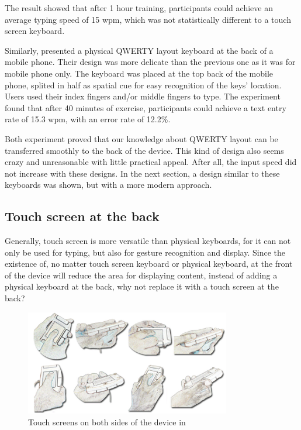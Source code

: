 \documentclass[11pt]{article}
\begin{document}
The result showed that after 1 hour training, participants could achieve an average typing speed of 15 wpm, which was not statistically different to a touch screen keyboard. 

Similarly, \citet{backkey2012} presented a physical QWERTY layout keyboard at the back of a mobile phone. Their design was more delicate than the previous one as it was for mobile phone only. The keyboard was placed at the top back of the mobile phone, splited in half as spatial cue for easy recognition of the keys' location. Users used their index fingers and/or middle fingers to type. The experiment found that after 40 minutes of exercise, participants could achieve a text entry rate of 15.3 wpm, with an error rate of 12.2\%. 

Both experiment proved that our knowledge about QWERTY layout can be transferred smoothly to the back of the device. This kind of design also seems crazy and unreasonable with little practical appeal. After all, the input speed did not increase with these designs. In the next section, a design similar to these keyboards was shown, but with a more modern approach.

\subsection{Touch screen at the back}
Generally, touch screen is more versatile than physical keyboards, for it can not only be used for typing, but also for gesture recognition and display. Since the existence of, no matter touch screen keyboard or physical keyboard, at the front of the device will reduce the area for displaying content, instead of adding a physical keyboard at the back, why not replace it with a touch screen at the back?

\begin{figure}[H]
  \centering
  \includegraphics[width=0.8\textwidth]{HandPostureFrontBack.png}
  \caption{Touch screens on both sides of the device in \citep{handposture2008}}
  \label{fig:handposturefrontback}
\end{figure}
\end{document}
